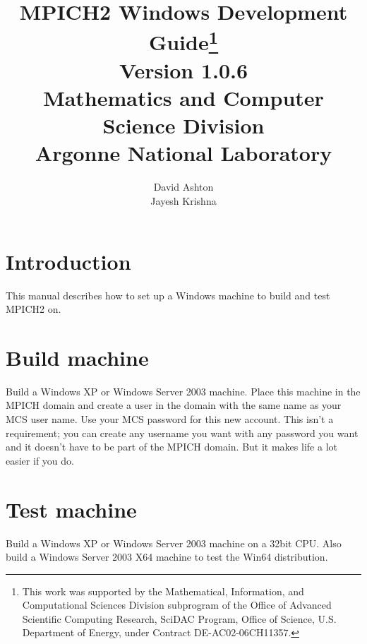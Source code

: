 \documentclass[dvipdfm,11pt]{article}
\begin{document}
\title{{\bf MPICH2 Windows Development Guide}\thanks{This work was supported by the
    Mathematical, Information, and Computational Sciences Division
    subprogram of the Office of Advanced Scientific Computing Research,
    SciDAC Program, Office of Science, U.S. Department of Energy, under
    Contract DE-AC02-06CH11357.}\\
  Version 1.0.6\\
  Mathematics and Computer Science Division\\
  Argonne National Laboratory}

\author{David Ashton\\
Jayesh Krishna}

\maketitle
\cleardoublepage

\tableofcontents
\clearpage

\pagestyle{headings}

\section{Introduction}
\label{sec:intro}
This manual describes how to set up a Windows machine to build and test MPICH2 on.

\section{Build machine}
\label{sec:machine}

Build a Windows XP or Windows Server 2003 machine.  Place this machine in the MPICH domain
and create a user in the domain with the same name as your MCS user name.  Use your MCS 
password for this new account.  This isn't a requirement; you can create any username you
want with any password you want and it doesn't have to be part of the MPICH domain.
But it makes life a lot easier if you do.

\section{Test machine}
\label{sec:test_machine}

Build a Windows XP or Windows Server 2003 machine on a 32bit CPU.
Also build a Windows Server 2003 X64 machine to test the Win64 distribution.

\end{document}
